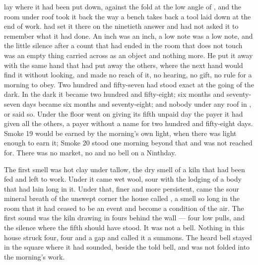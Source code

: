 
 lay where it had been put down, against the fold at the low angle of , and the room under  roof took it back the way a bench takes back a tool laid down at the end of work.  had set it there on the ninetieth answer and had not asked it to remember what it had done. An inch was an inch, a low note was a low note, and the little silence after a count that had ended in the room that does not touch was an empty thing carried across as an object and nothing more. He put it away with the same hand that had put away the others, where the next hand would find it without looking, and made no reach of it, no hearing, no gift, no rule for a morning to obey. Two hundred and fifty-seven had stood exact at the going of the dark. In the dark it became two hundred and fifty-eight; six months and seventy-seven days became six months and seventy-eight; and nobody under any roof in ,  or  said so. Under the floor  went on giving its fifth unpaid day the payer it had given all the others, a payer without a name for two hundred and fifty-eight days. Smoke 19 would be earned by the morning's own light, when there was light enough to earn it; Smoke 20 stood one morning beyond that and was not reached for. There was no market, no  and no bell on a Ninthday.

The first smell was hot clay under tallow, the dry smell of a kiln that had been fed and left to work. Under it came wet wool, sour with the lodging of a body that had lain long in it. Under that, finer and more persistent, came the sour mineral breath of the unswept corner the house called , a smell so long in the room that it had ceased to be an event and become a condition of the air. The first sound was the kiln drawing in fours behind the wall --- four low pulls, and the silence where the fifth should have stood. It was not a bell. Nothing in this house struck four, four and a gap and called it a summons. The heard bell stayed in the square where it had sounded, beside the told bell, and was not folded into the morning's work.

